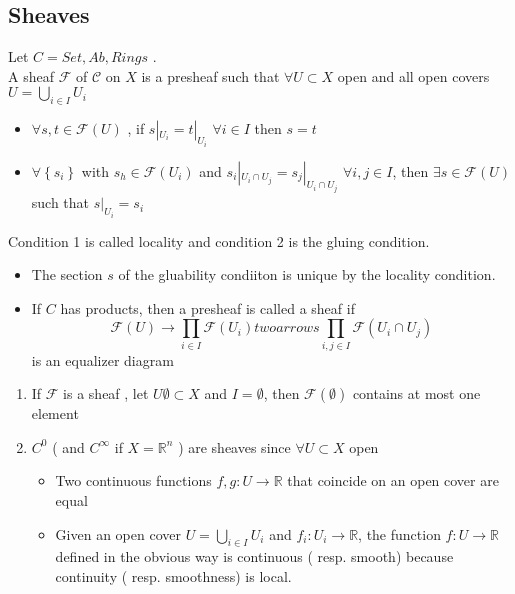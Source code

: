 \documentclass[../main.tex]{subfiles}
\begin{document}
\subsection{Sheaves}
\begin{defn}[Sheaf]
	Let $C = Set, Ab,Rings$ .\\
	A sheaf $\mathcal{F}$ of $\mathcal{C}$ on $X$ is a presheaf such that $\forall U \subset X $ open and all open covers $U = \bigcup_{i \in I} U_i$ 
	\begin{itemize}
	\item $\forall s,t\in \mathcal{F}( U) $ , if $s|_{U_i} = t|_{U_i} $ $\forall i \in I$ then $s=t$
	\item  $\forall \left\{ s_i \right\} $ with $s_h\in \mathcal{F}( U_i) $ and $s_i|_{U_i \cap U_j} =s_j |_{ U_i \cap U_j} $ $\forall i,j\in I$, then $\exists s \in \mathcal{F}( U) $ such that $s|_{U_i} = s_i$ 
	\end{itemize}
\end{defn}
Condition 1 is called locality and condition 2 is the gluing condition.
\begin{rmq}
	\begin{itemize}
		\item The section $s$ of the gluability condiiton is unique by the locality condition.
	\item If $C$ has products, then a presheaf is called a sheaf if 
		\[ 
		\mathcal{F}( U) \to\prod_{i\in I} \mathcal{F}( U_i) twoarrows  \prod_{i,j \in I} \mathcal{F}( U_i \cap U_j) 
		\]
		is an equalizer diagram
		
	\end{itemize}
\end{rmq}
\begin{exemple}
\begin{enumerate}
\item If $\mathcal{F}$ is a sheaf , let $U \emptyset  \subset X$ and $I = \emptyset$, then $\mathcal{F}( \emptyset ) $ contains at most one element
\item $C^{0}$ ( and $C^{ \infty }$ if $X = \mathbb{R}^{n}$ ) are sheaves since $\forall U \subset X$ open
	\begin{itemize}
	\item Two continuous functions $f,g:U \to \mathbb{R}$ that coincide on an open cover are equal
	\item Given an open cover $U= \bigcup_{i \in I} U_i$ and $f_i: U_i \to \mathbb{R}$, the function $f:U \to \mathbb{R} $ defined in the obvious way is continuous ( resp. smooth) because continuity ( resp. smoothness) is local.
	\end{itemize}
\end{enumerate}
\end{exemple}
\end{document}
